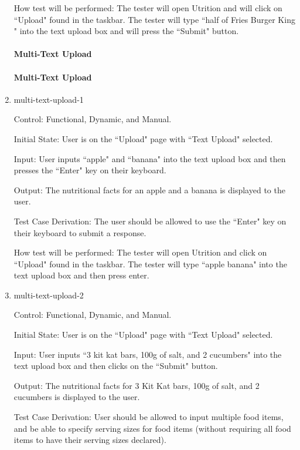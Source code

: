 \documentclass[12pt, titlepage]{article}
\begin{document}
\begin{enumerate}
	How test will be performed: The tester will open Utrition and will click on ``Upload" found in the taskbar. The tester will type ``half of Fries Burger King
	" into the text upload box and will press the ``Submit" button.
	
	\paragraph{Multi-Text Upload}
	\paragraph{Multi-Text Upload}
	
	\item{multi-text-upload-1\\}
	
	Control: Functional, Dynamic, and Manual.
	
	Initial State: User is on the ``Upload" page with ``Text Upload" selected.
	
	Input: User inputs ``apple" and ``banana" into the text upload box and then presses the ``Enter" key on their keyboard.
	
	Output: The nutritional facts for an apple and a banana is displayed to the user.
	
	Test Case Derivation: The user should be allowed to use the ``Enter" key on their keyboard to submit a response.
	
	How test will be performed: The tester will open Utrition and click on ``Upload" found in the taskbar. The tester will type ``apple banana" into the text upload box and then press enter. 
	
	\item{multi-text-upload-2\\}
	
	Control: Functional, Dynamic, and Manual.
	
	Initial State: User is on the ``Upload" page with ``Text Upload" selected.
	
	Input: User inputs ``3 kit kat bars, 100g of salt, and 2 cucumbers" into the text upload box and then clicks on the ``Submit" button.
	
	Output: The nutritional facts for 3 Kit Kat bars, 100g of salt, and 2 cucumbers is displayed to the user.
	
	Test Case Derivation: User should be allowed to input multiple food items, and be able to specify serving sizes for food items (without requiring all food items to have their serving sizes declared).
	

\end{enumerate}
\end{document}
